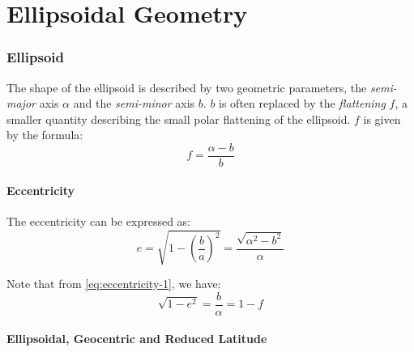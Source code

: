 \chapter{Ellipsoidal Geometry}
\label{ch:ellipsoidal-geometry}

\subsection{Ellipsoid}
\label{sec:ellipsoid}
The shape of the ellipsoid is described by two geometric parameters, the 
\emph{semi-major} axis $\alpha$ and the \emph{semi-minor} axis $b$. $b$ is 
often replaced by the \emph{flattening} $f$, a smaller quantity describing the 
small polar flattening of the ellipsoid. $f$ is given by the formula:
\begin{equation}
  f = \frac{\alpha -b}{b}
  \label{eq:flattening}
\end{equation}

\subsubsection{Eccentricity}
\label{sssec:eccentricity}
The eccentricity can be expressed as:
\begin{equation}
  e = \sqrt{1 - \left( \frac{b}{a} \right)^2 }
    = \frac{\sqrt{\alpha ^2 - b^2}}{\alpha}
  \label{eq:eccentricity-1}
\end{equation}

Note that from \ref{eq:eccentricity-1}, we have:
\begin{equation}
  \sqrt{1-e^2} = \frac{b}{\alpha} = 1 - f
  \label{eq:eccentricity-2}
\end{equation}

\subsubsection{Ellipsoidal, Geocentric and Reduced Latitude}
\label{sssec:ellipsoidal-and-geocentric-latitude}

